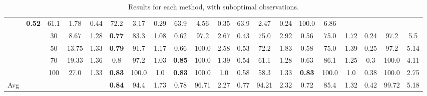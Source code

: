 \documentclass[letterpaper]{article}
\begin{document}
\begin{table*}[]
\begin{tabular}{|c|c|ccc|ccc|ccc|ccc|ccc|ccc|}
		& \textbf{0.52} & 61.1 & 1.78 	 

		& 0.44 & 72.2 & 3.17 	 

		& 0.29 & 63.9 & 4.56 	 

		& 0.35 & 63.9 & 2.47 	 

		& 0.24 & 100.0 & 6.86 	 

	\\ & & 30	 & 8.67	 & 1.28

		& \textbf{0.77} & 83.3 & 1.08 	 

		& 0.62 & 97.2 & 2.67 	 

		& 0.43 & 75.0 & 2.92 	 

		& 0.56 & 75.0 & 1.72 	 

		& 0.24 & 97.2 & 5.5 	 

	\\ & & 50	 & 13.75	 & 1.33

		& \textbf{0.79} & 91.7 & 1.17 	 

		& 0.66 & 100.0 & 2.58 	 

		& 0.53 & 72.2 & 1.83 	 

		& 0.58 & 75.0 & 1.39 	 

		& 0.25 & 97.2 & 5.14 	 

	\\ & & 70	 & 19.33	 & 1.36

		& 0.8 & 97.2 & 1.03 	 

		& \textbf{0.85} & 100.0 & 1.39 	 

		& 0.54 & 61.1 & 1.28 	 

		& 0.63 & 86.1 & 1.25 	 

		& 0.3 & 100.0 & 4.11 	 

	\\ & & 100	 & 27.0	 & 1.33

		& \textbf{0.83} & 100.0 & 1.0 	 

		& \textbf{0.83} & 100.0 & 1.0 	 

		& 0.58 & 58.3 & 1.33 	 

		& \textbf{0.83} & 100.0 & 1.0 	 

		& 0.38 & 100.0 & 2.75 	 
 \\ \hline
Avg & & & &  & \textbf{0.84} & 94.4 & 1.73 & 0.78 & 96.71 & 2.27 & 0.77 & 94.21 & 2.32 & 0.72 & 85.4 & 1.32 & 0.42 & 99.72 & 5.18
\\ \hline
\end{tabular}
\caption{Results for each method, with suboptimal observations.}
\end{table*}
\end{document}
